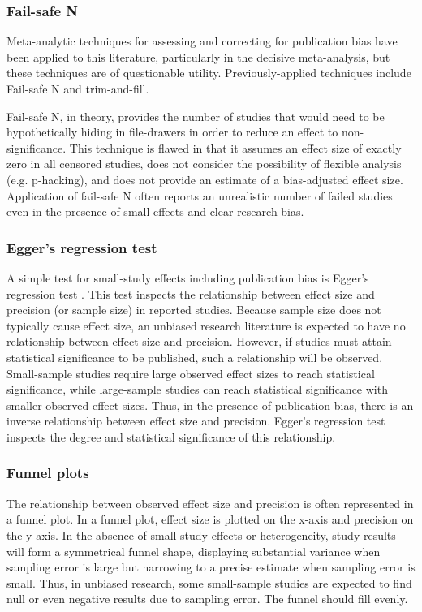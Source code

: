 \documentclass[man]{apa6}
\begin{document}
\subsubsection{Fail-safe N}
Meta-analytic techniques for assessing and correcting for publication bias have been applied to this literature, particularly in the decisive \citet{Anderson:etal:2010} meta-analysis, but these techniques are of questionable utility. Previously-applied techniques include Fail-safe N and trim-and-fill.

Fail-safe N, in theory, provides the number of studies %
that would need to be hypothetically hiding in file-drawers in order to reduce an effect to non-significance. This technique is flawed in that it assumes an effect size of exactly zero in all censored studies, does not consider the possibility of flexible analysis (e.g. p-hacking), and does not provide an estimate of a bias-adjusted effect size. Application of fail-safe N often reports an unrealistic number of failed studies even in the presence of small effects and clear research bias. %

\subsubsection{Egger's regression test}
A simple test for small-study effects including publication bias is Egger's regression test \citep{Egger:1997}. This test inspects the relationship between effect size and precision (or sample size) in reported studies. Because sample size does not typically cause effect size, an unbiased research literature is expected to have no relationship between effect size and precision. However, if studies must attain statistical significance to be published, such a relationship will be observed. Small-sample studies require large observed effect sizes to reach statistical significance, while large-sample studies can reach statistical significance with smaller observed effect sizes. Thus, in the presence of publication bias, there is an inverse relationship between effect size and precision. Egger's regression test inspects the degree and statistical significance of this relationship.

\subsubsection{Funnel plots}
The relationship between observed effect size and precision is often represented in a funnel plot. In a funnel plot, effect size is plotted on the x-axis and precision on the y-axis. In the absence of small-study effects or heterogeneity, study results will form a symmetrical funnel shape, displaying substantial variance when sampling error is large but narrowing to a precise estimate when sampling error is small. Thus, in unbiased research, some small-sample studies are expected to find null or even negative results due to sampling error. The funnel should fill evenly.
\end{document}
